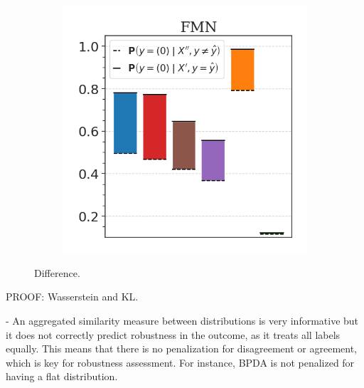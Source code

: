 \begin{figure}[H]
\begin{subfigure}[b]{0.49\textwidth}
        \includegraphics[width=\textwidth]{img/results_discussion/adversarial/DIFF_FMN.png}
    \end{subfigure}
    \caption{Difference.}
    \label{fig:gaussian_optimization}
\end{figure}


PROOF: Wasserstein and KL.

- An aggregated similarity measure between distributions is very informative but it does not correctly predict robustness in the outcome, as it treats all labels equally. This means that there is no penalization for disagreement or agreement, which is key for robustness assessment. For instance, BPDA is not penalized for having a flat distribution.

